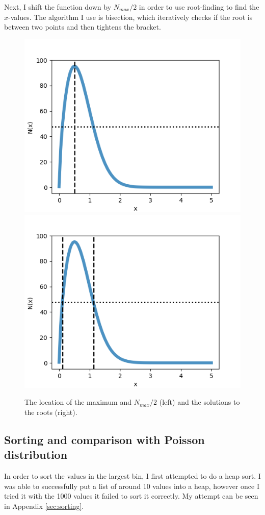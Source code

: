     

    Next, I shift the function down by $N_{max}/2$ in order to use root-finding to find the $x$-values. The algorithm I use is bisection, which iteratively checks if the root is between two points and then tightens the bracket.

    


    

    \begin{figure}[H]
        \centering
        \includegraphics[width=.45\textwidth]{output/2f_max.png}
        \includegraphics[width=.45\textwidth]{output/2f_roots.png}
        \caption{The location of the maximum and $N_{max}/2$ (left) and the solutions to the roots (right).}
    \end{figure}

    


    \newpage
    \subsection{Sorting and comparison with Poisson distribution}

    In order to sort the values in the largest bin, I first attempted to do a heap sort. I was able to successfully put a list of around 10 values into a heap, however once I tried it with the 1000 values it failed to sort it correctly. My attempt can be seen in Appendix \ref{sec:sorting}. 


